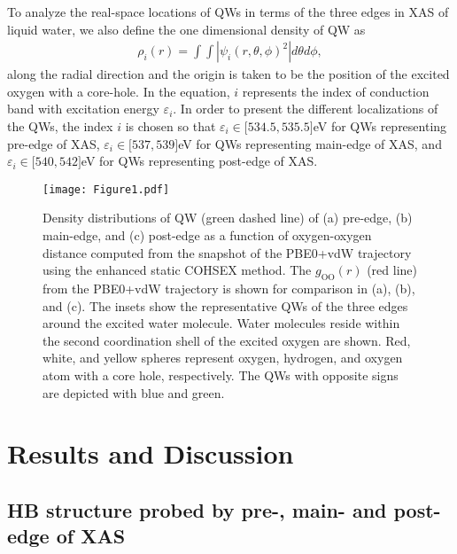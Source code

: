 \documentclass[prb,twocolumn,showpacs,preprintnumbers,superscriptaddress,amsmath,amssymb]{revtex4}
\begin{document}
To analyze the real-space locations of QWs in terms of 
the three edges in XAS of liquid water, we also define the one dimensional 
density of QW as
\begin{align}
\rho_{i}(r)=\int\int |\psi_{i}(r,\theta,\phi)^2|d\theta d\phi,
\end{align}
along the radial direction and the origin is taken to be the position of the 
excited oxygen with a core-hole.
In the equation, $i$ represents the index of conduction band with excitation 
energy $\varepsilon_{i}$. In order to present the different localizations of the QWs, the 
index $i$ is chosen so that $\varepsilon_i\in\lbrack 534.5,535.5 \rbrack$eV for 
QWs representing pre-edge of XAS, 
$\varepsilon_i\in\lbrack 537,539 \rbrack$eV for QWs representing main-edge of XAS,
and $\varepsilon_i\in\lbrack 540,542 \rbrack$eV for QWs representing post-edge of XAS.



\begin{figure}
  \texttt{[image: Figure1.pdf]}
  \caption{Density distributions of QW (green dashed line) of (a) pre-edge, (b) main-edge, and (c) post-edge
as a function of oxygen-oxygen distance
computed from the snapshot of the PBE0+vdW trajectory using the enhanced static COHSEX method.
The $g_{\mathrm{OO}}(r)$ (red line) from the PBE0+vdW trajectory is shown for comparison in (a), (b), and (c).
The insets show the representative QWs of the three edges around the excited water molecule.
Water molecules reside within the second coordination shell of the excited oxygen are shown.
Red, white, and yellow spheres represent oxygen, hydrogen, and oxygen atom with a core hole, respectively.
The QWs with opposite signs are depicted with blue and green.
}
  \label{figwf}
\end{figure}


\section{Results and Discussion}

\subsection{HB structure probed by pre-, main- and post-edge of XAS}
\end{document}
